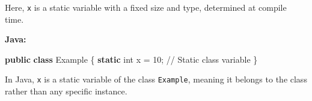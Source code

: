 \documentclass[
  letterpaper,
  DIV=11,
  numbers=noendperiod]{scrreprt}
\newenvironment{Shaded}{\begin{snugshade}}{\end{snugshade}}
\newcommand{\CommentTok}[1]{\textcolor[rgb]{0.37,0.37,0.37}{#1}}
\newcommand{\DecValTok}[1]{\textcolor[rgb]{0.68,0.00,0.00}{#1}}
\newcommand{\KeywordTok}[1]{\textcolor[rgb]{0.00,0.23,0.31}{\textbf{#1}}}
\newcommand{\NormalTok}[1]{\textcolor[rgb]{0.00,0.23,0.31}{#1}}
\newcommand{\OperatorTok}[1]{\textcolor[rgb]{0.37,0.37,0.37}{#1}}
\begin{document}
\begin{tcolorbox}[enhanced jigsaw, colframe=quarto-callout-note-color-frame, toprule=.15mm, bottomrule=.15mm, rightrule=.15mm, colback=white, breakable, arc=.35mm, opacityback=0, left=2mm, leftrule=.75mm]
Here, \texttt{x} is a static variable with a fixed size and type,
determined at compile time.

\textbf{Java:}

\begin{Shaded}
\begin{Highlighting}[]
\KeywordTok{public} \KeywordTok{class}\NormalTok{ Example \{}
    \KeywordTok{static}\NormalTok{ int x }\OperatorTok{=} \DecValTok{10}\OperatorTok{;} \CommentTok{// Static class variable}
\NormalTok{\}}
\end{Highlighting}
\end{Shaded}

In Java, \texttt{x} is a static variable of the class \texttt{Example},
meaning it belongs to the class rather than any specific instance.

\end{tcolorbox}
\end{document}
